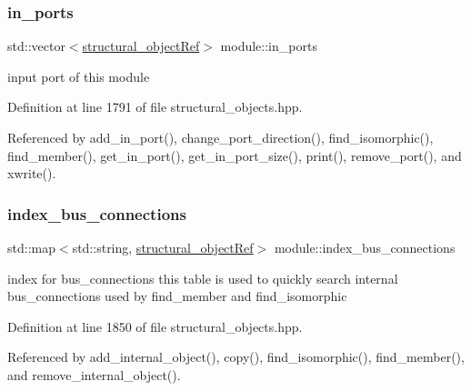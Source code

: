 \subsubsection{\texorpdfstring{in\+\_\+ports}{in\_ports}}
{\footnotesize\ttfamily std\+::vector$<$\hyperlink{structural__objects_8hpp_a8ea5f8cc50ab8f4c31e2751074ff60b2}{structural\+\_\+object\+Ref}$>$ module\+::in\+\_\+ports\hspace{0.3cm}{\ttfamily [private]}}



input port of this module 



Definition at line 1791 of file structural\+\_\+objects.\+hpp.



Referenced by add\+\_\+in\+\_\+port(), change\+\_\+port\+\_\+direction(), find\+\_\+isomorphic(), find\+\_\+member(), get\+\_\+in\+\_\+port(), get\+\_\+in\+\_\+port\+\_\+size(), print(), remove\+\_\+port(), and xwrite().

\mbox{\label{classmodule_acc95d1b1134c0d763845bff62c013e55}} 
\subsubsection{\texorpdfstring{index\+\_\+bus\+\_\+connections}{index\_bus\_connections}}
{\footnotesize\ttfamily std\+::map$<$std\+::string, \hyperlink{structural__objects_8hpp_a8ea5f8cc50ab8f4c31e2751074ff60b2}{structural\+\_\+object\+Ref}$>$ module\+::index\+\_\+bus\+\_\+connections\hspace{0.3cm}{\ttfamily [private]}}



index for bus\+\_\+connections this table is used to quickly search internal bus\+\_\+connections used by find\+\_\+member and find\+\_\+isomorphic 



Definition at line 1850 of file structural\+\_\+objects.\+hpp.



Referenced by add\+\_\+internal\+\_\+object(), copy(), find\+\_\+isomorphic(), find\+\_\+member(), and remove\+\_\+internal\+\_\+object().

\mbox{\label{classmodule_a6cfe29c1057a2c772f4bfa8b2fffd0fa}} 
